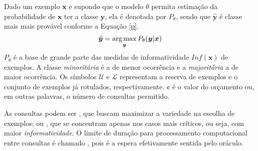Dado um exemplo $\bm{x}$ e supondo que o modelo $\theta$ permita
estimação da probabilidade de $\bm{x}$ ter a classe $\bm{y}$,
ela é denotada por $P_{\theta}$,
sendo que $\hat{\bm{y}}$ é classe mais mais provável conforme a Equação \ref{p}.
\begin{equation}\label{p}
  \hat{\bm{y}} = \operatorname*{arg\,max}_{\bm{y}} P_{\theta} (\bm{y}|\bm{x})
\end{equation}
$P_{\theta}$ é a base de grande parte das medidas de informatividade $Inf(\bm{x})$ de exemplos.
A classe \textit{minoritária} é a de menor ocorrência e a \textit{majoritária} a de maior ocorrência.
Os símbolos $\mathcal{U}$ e $\mathcal{L}$ representam a
reserva de exemplos \citep{series/synthesis/2012Settles}
e o conjunto de exemplos já rotulados, respectivamente.
$\cent$ é o valor do orçamento ou, em outras palavras, o número de consultas permitido.




As consultas podem ser , que buscam maximizar
a variedade na escolha de exemplos; ou ,
que se concentram apenas nos casos mais críticos,
ou seja, com maior \textit{informatividade}.
O limite de duração para processamento computacional entre consultas
é chamado ,
pois é a espera efetivamente sentida pelo oráculo.